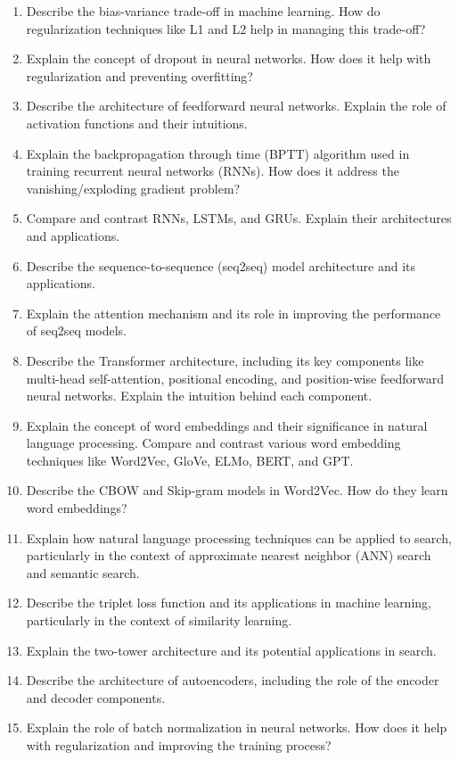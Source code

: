 \documentclass[12pt]{article}
\begin{document}
\begin{enumerate}
  \item Describe the bias-variance trade-off in machine learning. How do regularization techniques like L1 and L2 help in managing this trade-off?
  \item Explain the concept of dropout in neural networks. How does it help with regularization and preventing overfitting?
  \item Describe the architecture of feedforward neural networks. Explain the role of activation functions and their intuitions.
  \item Explain the backpropagation through time (BPTT) algorithm used in training recurrent neural networks (RNNs). How does it address the vanishing/exploding gradient problem?
  \item Compare and contrast RNNs, LSTMs, and GRUs. Explain their architectures and applications.
  \item Describe the sequence-to-sequence (seq2seq) model architecture and its applications.
  \item Explain the attention mechanism and its role in improving the performance of seq2seq models.
  \item Describe the Transformer architecture, including its key components like multi-head self-attention, positional encoding, and position-wise feedforward neural networks. Explain the intuition behind each component.
  \item Explain the concept of word embeddings and their significance in natural language processing. Compare and contrast various word embedding techniques like Word2Vec, GloVe, ELMo, BERT, and GPT.
  \item Describe the CBOW and Skip-gram models in Word2Vec. How do they learn word embeddings?
  \item Explain how natural language processing techniques can be applied to search, particularly in the context of approximate nearest neighbor (ANN) search and semantic search.
  \item Describe the triplet loss function and its applications in machine learning, particularly in the context of similarity learning.
  \item Explain the two-tower architecture and its potential applications in search.
  \item Describe the architecture of autoencoders, including the role of the encoder and decoder components.
  \item Explain the role of batch normalization in neural networks. How does it help with regularization and improving the training process?

\end{enumerate}
\end{document}
